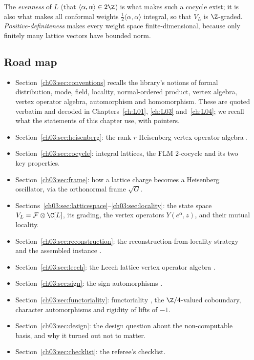 The \emph{evenness} of $L$ (that $\langle\alpha,\alpha\rangle\in 2\Z$) is what makes such a cocycle
exist; it is also what makes all conformal weights $\frac12\langle\alpha,\alpha\rangle$ integral, so
that $V_L$ is $\Z$-graded. \emph{Positive-definiteness} makes every weight space
finite-dimensional, because only finitely many lattice vectors have bounded norm.

\subsection{Road map}

\begin{itemize}[leftmargin=2em]
\item Section~\ref{ch03:sec:conventions} recalls the library's notions of formal
  distribution, mode, field, locality, normal-ordered product, vertex algebra, vertex operator
  algebra, automorphism and homomorphism. These are quoted verbatim and decoded in
  Chapters~\ref{ch:L01}, \ref{ch:L03} and~\ref{ch:L04}; we recall what the statements of this
  chapter use, with pointers.
\item Section~\ref{ch03:sec:heisenberg}: the rank-$r$ Heisenberg vertex operator algebra
  .
\item Section~\ref{ch03:sec:cocycle}: integral lattices, the FLM $2$-cocycle
   and its two key properties.
\item Section~\ref{ch03:sec:frame}: how a lattice charge becomes a Heisenberg oscillator, via the
  orthonormal frame $\sqrt G$.
\item Sections~\ref{ch03:sec:latticespace}--\ref{ch03:sec:locality}: the state space
  $V_L=\mathcal F\otimes\C[L]$, its grading, the vertex operators $Y(e^\alpha,z)$, and their mutual
  locality.
\item Section~\ref{ch03:sec:reconstruction}: the reconstruction-from-locality strategy and the
  assembled instance .
\item Section~\ref{ch03:sec:leech}: the Leech lattice vertex operator algebra
  .
\item Section~\ref{ch03:sec:sign}: the sign automorphisms .
\item Section~\ref{ch03:sec:functoriality}: functoriality , the
  $\Z/4$-valued coboundary, character automorphisms and rigidity of lifts of $-1$.
\item Section~\ref{ch03:sec:design}: the design question about the non-computable basis, and why
  it turned out not to matter.
\item Section~\ref{ch03:sec:checklist}: the referee's checklist.
\end{itemize}

